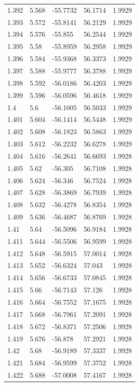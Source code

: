 \begin{tabular}{lllll}
1.392 & 5.568 & -55.7732 & 56.1714 & 1.9929 \\
1.393 & 5.572 & -55.8141 & 56.2129 & 1.9929 \\
1.394 & 5.576 & -55.855 & 56.2544 & 1.9929 \\
1.395 & 5.58 & -55.8959 & 56.2958 & 1.9929 \\
1.396 & 5.584 & -55.9368 & 56.3373 & 1.9929 \\
1.397 & 5.588 & -55.9777 & 56.3788 & 1.9929 \\
1.398 & 5.592 & -56.0186 & 56.4203 & 1.9929 \\
1.399 & 5.596 & -56.0596 & 56.4618 & 1.9929 \\
1.4 & 5.6 & -56.1005 & 56.5033 & 1.9929 \\
1.401 & 5.604 & -56.1414 & 56.5448 & 1.9929 \\
1.402 & 5.608 & -56.1823 & 56.5863 & 1.9929 \\
1.403 & 5.612 & -56.2232 & 56.6278 & 1.9929 \\
1.404 & 5.616 & -56.2641 & 56.6693 & 1.9928 \\
1.405 & 5.62 & -56.305 & 56.7108 & 1.9928 \\
1.406 & 5.624 & -56.346 & 56.7524 & 1.9928 \\
1.407 & 5.628 & -56.3869 & 56.7939 & 1.9928 \\
1.408 & 5.632 & -56.4278 & 56.8354 & 1.9928 \\
1.409 & 5.636 & -56.4687 & 56.8769 & 1.9928 \\
1.41 & 5.64 & -56.5096 & 56.9184 & 1.9928 \\
1.411 & 5.644 & -56.5506 & 56.9599 & 1.9928 \\
1.412 & 5.648 & -56.5915 & 57.0014 & 1.9928 \\
1.413 & 5.652 & -56.6324 & 57.043 & 1.9928 \\
1.414 & 5.656 & -56.6733 & 57.0845 & 1.9928 \\
1.415 & 5.66 & -56.7143 & 57.126 & 1.9928 \\
1.416 & 5.664 & -56.7552 & 57.1675 & 1.9928 \\
1.417 & 5.668 & -56.7961 & 57.2091 & 1.9928 \\
1.418 & 5.672 & -56.8371 & 57.2506 & 1.9928 \\
1.419 & 5.676 & -56.878 & 57.2921 & 1.9928 \\
1.42 & 5.68 & -56.9189 & 57.3337 & 1.9928 \\
1.421 & 5.684 & -56.9599 & 57.3752 & 1.9928 \\
1.422 & 5.688 & -57.0008 & 57.4167 & 1.9928 \\

\end{tabular}
